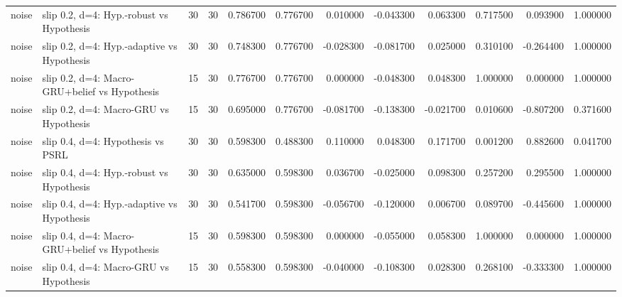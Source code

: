 \begin{tabular}{llrrrrrrrrrr}
noise & slip 0.2, d=4: Hyp.-robust vs Hypothesis & 30 & 30 & 0.786700 & 0.776700 & 0.010000 & -0.043300 & 0.063300 & 0.717500 & 0.093900 & 1.000000 \\
noise & slip 0.2, d=4: Hyp.-adaptive vs Hypothesis & 30 & 30 & 0.748300 & 0.776700 & -0.028300 & -0.081700 & 0.025000 & 0.310100 & -0.264400 & 1.000000 \\
noise & slip 0.2, d=4: Macro-GRU+belief vs Hypothesis & 15 & 30 & 0.776700 & 0.776700 & 0.000000 & -0.048300 & 0.048300 & 1.000000 & 0.000000 & 1.000000 \\
noise & slip 0.2, d=4: Macro-GRU vs Hypothesis & 15 & 30 & 0.695000 & 0.776700 & -0.081700 & -0.138300 & -0.021700 & 0.010600 & -0.807200 & 0.371600 \\
noise & slip 0.4, d=4: Hypothesis vs PSRL & 30 & 30 & 0.598300 & 0.488300 & 0.110000 & 0.048300 & 0.171700 & 0.001200 & 0.882600 & 0.041700 \\
noise & slip 0.4, d=4: Hyp.-robust vs Hypothesis & 30 & 30 & 0.635000 & 0.598300 & 0.036700 & -0.025000 & 0.098300 & 0.257200 & 0.295500 & 1.000000 \\
noise & slip 0.4, d=4: Hyp.-adaptive vs Hypothesis & 30 & 30 & 0.541700 & 0.598300 & -0.056700 & -0.120000 & 0.006700 & 0.089700 & -0.445600 & 1.000000 \\
noise & slip 0.4, d=4: Macro-GRU+belief vs Hypothesis & 15 & 30 & 0.598300 & 0.598300 & 0.000000 & -0.055000 & 0.058300 & 1.000000 & 0.000000 & 1.000000 \\
noise & slip 0.4, d=4: Macro-GRU vs Hypothesis & 15 & 30 & 0.558300 & 0.598300 & -0.040000 & -0.108300 & 0.028300 & 0.268100 & -0.333300 & 1.000000 \\
\bottomrule
\end{tabular}
